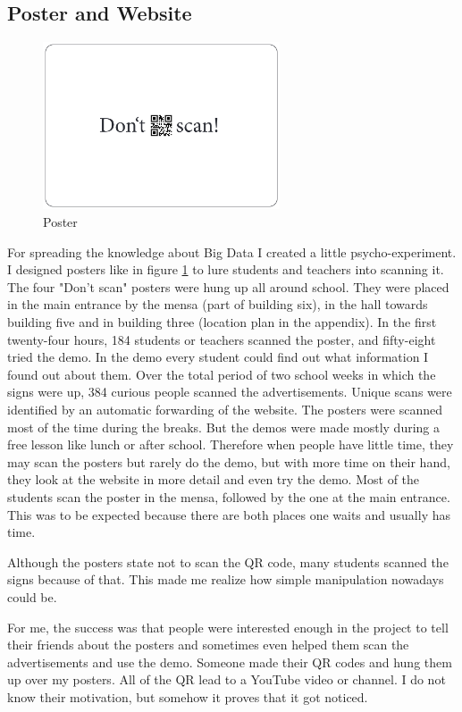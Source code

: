 \documentclass[paper=a4, fontsize=11pt]{article}
\begin{document}
\subsection{Poster and Website}
\begin{figure}
\centering
\includegraphics [width = 7cm]{images/posternice.png}
\caption{Poster\label{poster}}
\end{figure}
For spreading the knowledge about Big Data I created a little psycho-experiment. I designed posters like in figure \ref{poster} to lure students and teachers into scanning it.
The four "Don't scan" posters were hung up all around school. They were placed in the main entrance by the mensa (part of building six), in the hall towards building five and in building three (location plan in the appendix). In the first twenty-four hours, 184 students or teachers scanned the poster, and fifty-eight tried the demo. In the demo every student could find out what information I found out about them. Over the total period of two school weeks in which the signs were up, 384 curious people scanned the advertisements. Unique scans were identified by an automatic forwarding of the website. The posters were scanned most of the time during the breaks. But the demos were made mostly during a free lesson like lunch or after school. Therefore when people have little time, they may scan the posters but rarely do the demo, but with more time on their hand, they look at the website in more detail and even try the demo. Most of the students scan the poster in the mensa, followed by the one at the main entrance. This was to be expected because there are both places one waits and usually has time.




Although the posters state not to scan the QR code, many students scanned the signs because of that. This made me realize how simple manipulation nowadays could be.

For me, the success was that people were interested enough in the project to tell their friends about the posters and sometimes even helped them scan the advertisements and use the demo. Someone made their QR codes and hung them up over my posters. All of the QR lead to a YouTube video or channel. I do not know their motivation, but somehow it proves that it got noticed.
\end{document}
